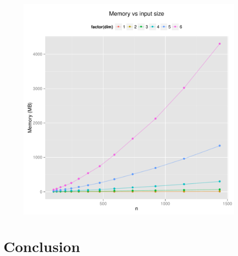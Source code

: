 \documentclass{article}
\begin{document}
\begin{figure}[H]
    \centering
    \includegraphics[width=\textwidth]{../src/R/plots/rtmem.pdf}
    \caption{}
\end{figure}
\newpage
\section{Conclusion}
\end{document}
